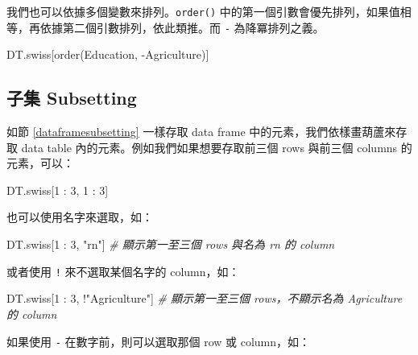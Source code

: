 \documentclass[
]{book}
\newenvironment{Shaded}{\begin{snugshade}}{\end{snugshade}}
\newcommand{\CommentTok}[1]{\textcolor[rgb]{0.56,0.35,0.01}{\textit{#1}}}
\newcommand{\DecValTok}[1]{\textcolor[rgb]{0.00,0.00,0.81}{#1}}
\newcommand{\FunctionTok}[1]{\textcolor[rgb]{0.00,0.00,0.00}{#1}}
\newcommand{\NormalTok}[1]{#1}
\newcommand{\SpecialCharTok}[1]{\textcolor[rgb]{0.00,0.00,0.00}{#1}}
\newcommand{\StringTok}[1]{\textcolor[rgb]{0.31,0.60,0.02}{#1}}
\theoremstyle{definition}
\theoremstyle{remark}
\begin{document}
我們也可以依據多個變數來排列。\texttt{order()} 中的第一個引數會優先排列，如果值相等，再依據第二個引數排列，依此類推。而 \texttt{-} 為降冪排列之義。

\begin{Shaded}
\begin{Highlighting}[]
\NormalTok{DT.swiss[}\FunctionTok{order}\NormalTok{(Education, }\SpecialCharTok{{-}}\NormalTok{Agriculture)]}
\end{Highlighting}
\end{Shaded}

\hypertarget{ux5b50ux96c6-subsetting}{%
\subsection{子集 Subsetting}\label{ux5b50ux96c6-subsetting}}

如節 \ref{dataframesubsetting} 一樣存取 data frame 中的元素，我們依樣畫葫蘆來存取 data table 內的元素。例如我們如果想要存取前三個 rows 與前三個 columns 的元素，可以：

\begin{Shaded}
\begin{Highlighting}[]
\NormalTok{DT.swiss[}\DecValTok{1} \SpecialCharTok{:} \DecValTok{3}\NormalTok{, }\DecValTok{1} \SpecialCharTok{:} \DecValTok{3}\NormalTok{]}
\end{Highlighting}
\end{Shaded}

也可以使用名字來選取，如：

\begin{Shaded}
\begin{Highlighting}[]
\NormalTok{DT.swiss[}\DecValTok{1} \SpecialCharTok{:} \DecValTok{3}\NormalTok{, }\StringTok{"rn"}\NormalTok{]}
\CommentTok{\# 顯示第一至三個 rows 與名為 rn 的 column}
\end{Highlighting}
\end{Shaded}

或者使用 \texttt{!} 來不選取某個名字的 column，如：

\begin{Shaded}
\begin{Highlighting}[]
\NormalTok{DT.swiss[}\DecValTok{1} \SpecialCharTok{:} \DecValTok{3}\NormalTok{, }\SpecialCharTok{!}\StringTok{"Agriculture"}\NormalTok{]}
\CommentTok{\# 顯示第一至三個 rows，不顯示名為 Agriculture 的 column}
\end{Highlighting}
\end{Shaded}

如果使用 \texttt{-} 在數字前，則可以選取那個 row 或 column，如：
\end{document}
